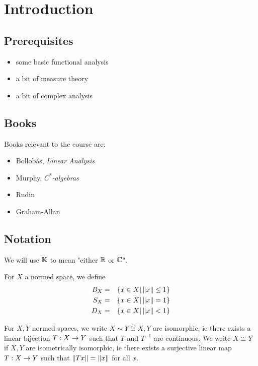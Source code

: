 \documentclass{article}
\begin{document}
\maketitle

\tableofcontents

\clearpage

\section{Introduction}

\subsection*{Prerequisites}

\begin{itemize}
  \item some basic functional analysis
  \item a bit of measure theory
  \item a bit of complex analysis
\end{itemize}

\subsection*{Books}

Books relevant to the course are:
\begin{itemize}
  \item Bollob\'as, \textit{Linear Analysis}
  \item Murphy, \textit{$C^*$-algebras}
  \item Rudin
  \item Graham-Allan
\end{itemize}

\subsection*{Notation}

We will use $\mathbb K$ to mean "either $\mathbb R$ or $\mathbb C$".

For $X$ a normed space, we define
\begin{eqnarray*}
  B_X & = & \{x \in X | \left\lVert x\right\rVert \le 1\} \\
  S_X & = & \{x \in X | \left\lVert x\right\rVert = 1\} \\
  D_X & = & \{x \in X | \left\lVert x\right\rVert < 1\}
\end{eqnarray*}

For $X, Y$ normed spaces, we write $X \sim Y$ if $X, Y$ are isomorphic, ie there
exists a linear bijection $T : X \rightarrow Y$ such that $T$ and $T^{-1}$ are continuous. We write $X \cong Y$ if $X, Y$ are isometrically isomorphic, ie there exists a surjective linear map $T : X \rightarrow Y$ such that $\left\lVert T x\right\rVert = \left\lVert x\right\rVert$ for all $x$.
\end{document}
